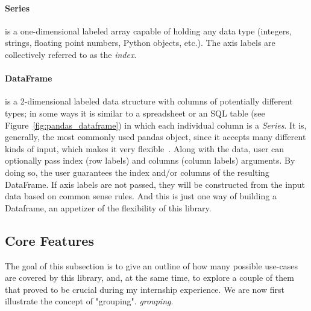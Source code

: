 \paragraph{Series} is a one-dimensional labeled array capable of holding any data type (integers, strings, floating point numbers, Python objects, etc.). 
The axis labels are collectively referred to as the \textit{index}.

\paragraph{DataFrame} is a 2-dimensional labeled data structure with columns of potentially different types; in some ways it is similar to
a spreadsheet or an SQL table (see Figure~\ref{fig:pandas_dataframe}) in which each individual column is a \textit{Series}.
It is, generally, the most commonly used pandas object, since it accepts many different kinds of input, which makes it very flexible~\cite{reback_pandas-dev/pandas:_2022}.
Along with the data, user
can optionally pass index (row labels) and columns (column labels) arguments. By doing so, the user guarantees the index and/or columns of the resulting DataFrame.
If axis labels are not passed, they will be constructed from the input data based on common sense rules.
And this is just one way of building a Dataframe, an appetizer of the flexibility of this library.

\subsection{Core Features}
The goal
of this subsection is to give an outline of how many possible use-cases are covered by this library, and, at the same time, to explore a couple of them that proved to be crucial during my internship experience.
We are now first illustrate the concept of "grouping". \textit{grouping}.

